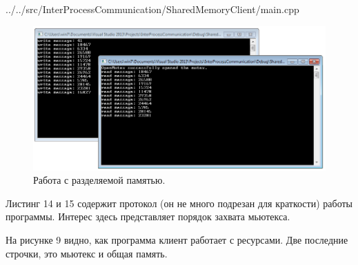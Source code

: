 \documentclass[a4paper, 12pt]{report}		%
\begin{document}
\vspace{3em}


{../../src/InterProcessCommunication/SharedMemoryClient/main.cpp}

\newpage
\begin{figure}[h!]
\centering
\includegraphics[scale=0.75]{res/08_Sharedmemory}
\caption{Работа с разделяемой памятью.}
\end{figure}

Листинг 14 и 15 содержит протокол (он не много подрезан для краткости) работы программы. Интерес здесь представляет порядок захвата мьютекса.





На рисунке 9 видно, как программа клиент работает с ресурсами. Две последние строчки, это мьютекс и общая память.
\end{document}

